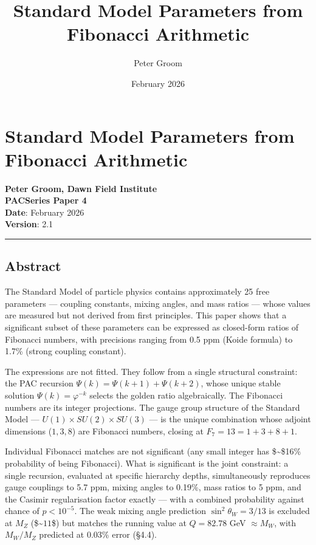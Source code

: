 \documentclass[
  11pt,
  a4paper]{article}
\title{Standard Model Parameters from Fibonacci Arithmetic}
\author{Peter Groom}
\date{February 2026}
\begin{document}
\maketitle

\renewcommand*\contentsname{Contents}
{
\setcounter{tocdepth}{3}
\tableofcontents
}
\section{Standard Model Parameters from Fibonacci
Arithmetic}\label{standard-model-parameters-from-fibonacci-arithmetic}

\textbf{Peter Groom, Dawn Field Institute}\\
\textbf{PACSeries Paper 4}\\
\textbf{Date}: February 2026\\
\textbf{Version}: 2.1

\begin{center}\rule{0.5\linewidth}{0.5pt}\end{center}

\subsection{Abstract}\label{abstract}

The Standard Model of particle physics contains approximately 25 free
parameters --- coupling constants, mixing angles, and mass ratios ---
whose values are measured but not derived from first principles. This
paper shows that a significant subset of these parameters can be
expressed as closed-form ratios of Fibonacci numbers, with precisions
ranging from 0.5 ppm (Koide formula) to 1.7\% (strong coupling
constant).

The expressions are not fitted. They follow from a single structural
constraint: the PAC recursion \(\Psi(k) = \Psi(k+1) + \Psi(k+2)\), whose
unique stable solution \(\Psi(k) = \varphi^{-k}\) selects the golden
ratio algebraically. The Fibonacci numbers are its integer projections.
The gauge group structure of the Standard Model ---
\(U(1) \times SU(2) \times SU(3)\) --- is the unique combination whose
adjoint dimensions (\(1, 3, 8\)) are Fibonacci numbers, closing at
\(F_7 = 13 = 1 + 3 + 8 + 1\).

Individual Fibonacci matches are not significant (any small integer has
\$\sim\$16\% probability of being Fibonacci). What is significant is the
joint constraint: a single recursion, evaluated at specific hierarchy
depths, simultaneously reproduces gauge couplings to 5.7 ppm, mixing
angles to 0.19\%, mass ratios to 5 ppm, and the Casimir regularisation
factor exactly --- with a combined probability against chance of
\(p < 10^{-5}\). The weak mixing angle prediction
\(\sin^2\theta_W = 3/13\) is excluded at \(M_Z\) (\$\sim\(11\)\sigma\$)
but matches the running value at \(Q = 82.78\) GeV \(\approx M_W\), with
\(M_W/M_Z\) predicted at 0.03\% error (§4.4).
\end{document}
